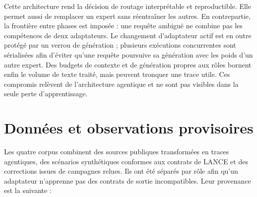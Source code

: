Cette architecture rend la décision de routage interprétable et reproductible.
Elle permet aussi de remplacer un expert sans réentraîner les autres. En
contrepartie, la frontière entre phases est imposée : une requête ambiguë ne
combine pas les compétences de deux adaptateurs. Le changement d'adaptateur
actif est en outre protégé par un verrou de génération ; plusieurs exécutions
concurrentes sont sérialisées afin d'éviter qu'une requête poursuive sa
génération avec les poids d'un autre expert. Des budgets de contexte et de
génération propres aux rôles bornent enfin le volume de texte traité, mais peuvent tronquer une
trace utile. Ces compromis relèvent de l'architecture agentique et ne sont pas
visibles dans la seule perte d'apprentissage.

\section{Données et observations provisoires}
\label{sec:hmoe-donnees}

Les quatre corpus combinent des sources publiques transformées en traces
agentiques, des scénarios synthétiques conformes aux contrats de LANCE et des
corrections issues de campagnes relues. Ils ont été séparés par rôle afin qu'un
adaptateur n'apprenne pas des contrats de sortie incompatibles. Leur provenance
est la suivante :


